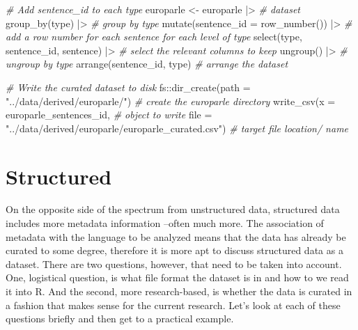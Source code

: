\documentclass[
  letterpaper,
]{scrbook}
\newenvironment{Shaded}{\begin{snugshade}}{\end{snugshade}}
\newcommand{\AttributeTok}[1]{\textcolor[rgb]{0.00,0.00,0.00}{#1}}
\newcommand{\CommentTok}[1]{\textcolor[rgb]{0.00,0.00,0.00}{\textit{#1}}}
\newcommand{\FunctionTok}[1]{\textcolor[rgb]{0.00,0.00,0.00}{#1}}
\newcommand{\NormalTok}[1]{\textcolor[rgb]{0.00,0.00,0.00}{#1}}
\newcommand{\OtherTok}[1]{\textcolor[rgb]{0.00,0.00,0.00}{#1}}
\newcommand{\SpecialCharTok}[1]{\textcolor[rgb]{0.00,0.00,0.00}{#1}}
\newcommand{\StringTok}[1]{\textcolor[rgb]{0.00,0.00,0.00}{#1}}
\begin{document}
\begin{Shaded}
\begin{Highlighting}[]
\CommentTok{\# Add \textasciigrave{}sentence\_id\textasciigrave{} to each \textasciigrave{}type\textasciigrave{}}
\NormalTok{europarle }\OtherTok{\textless{}{-}} 
\NormalTok{  europarle }\SpecialCharTok{|\textgreater{}} \CommentTok{\# dataset}
  \FunctionTok{group\_by}\NormalTok{(type) }\SpecialCharTok{|\textgreater{}} \CommentTok{\# group by type}
  \FunctionTok{mutate}\NormalTok{(}\AttributeTok{sentence\_id =} \FunctionTok{row\_number}\NormalTok{()) }\SpecialCharTok{|\textgreater{}} \CommentTok{\# add a row number for each sentence for each level of type}
  \FunctionTok{select}\NormalTok{(type, sentence\_id, sentence) }\SpecialCharTok{|\textgreater{}} \CommentTok{\# select the relevant columns to keep}
  \FunctionTok{ungroup}\NormalTok{() }\SpecialCharTok{|\textgreater{}}  \CommentTok{\# ungroup by type}
  \FunctionTok{arrange}\NormalTok{(sentence\_id, type) }\CommentTok{\# arrange the dataset}

\CommentTok{\# Write the curated dataset to disk}
\NormalTok{fs}\SpecialCharTok{::}\FunctionTok{dir\_create}\NormalTok{(}\AttributeTok{path =} \StringTok{"../data/derived/europarle/"}\NormalTok{) }\CommentTok{\# create the europarle directory}
\FunctionTok{write\_csv}\NormalTok{(}\AttributeTok{x =}\NormalTok{ europarle\_sentences\_id, }\CommentTok{\# object to write}
          \AttributeTok{file =} \StringTok{"../data/derived/europarle/europarle\_curated.csv"}\NormalTok{) }\CommentTok{\# target file location/ name}
\end{Highlighting}
\end{Shaded}

\hypertarget{structured}{%
\section{Structured}\label{structured}}

On the opposite side of the spectrum from unstructured data, structured
data includes more metadata information --often much more. The
association of metadata with the language to be analyzed means that the
data has already be curated to some degree, therefore it is more apt to
discuss structured data as a dataset. There are two questions, however,
that need to be taken into account. One, logistical question, is what
file format the dataset is in and how to we read it into R. And the
second, more research-based, is whether the data is curated in a fashion
that makes sense for the current research. Let's look at each of these
questions briefly and then get to a practical example.
\end{document}
